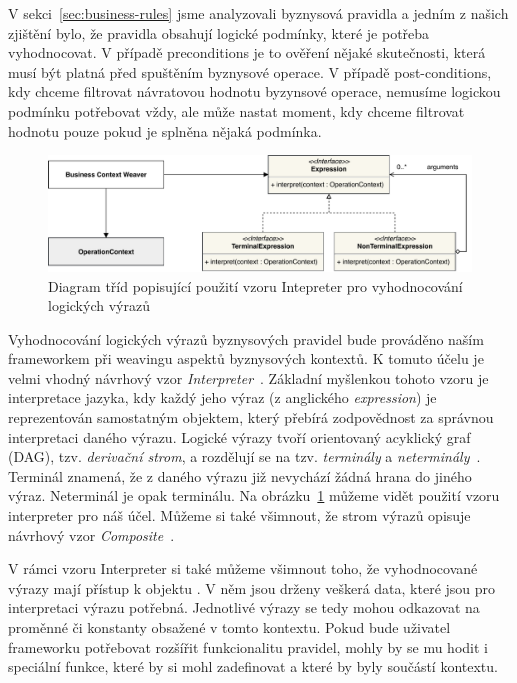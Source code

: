 V sekci~\ref{sec:business-rules} jsme analyzovali byznysová pravidla a jedním z
našich zjištění bylo, že pravidla obsahují logické podmínky, které je
potřeba vyhodnocovat. V případě preconditions je to ověření nějaké skutečnosti,
která musí být platná před spuštěním byznysové operace. V případě post-conditions,
kdy chceme filtrovat návratovou hodnotu byzynsové operace, nemusíme logickou podmínku
potřebovat vždy, ale může nastat moment, kdy chceme filtrovat hodnotu pouze pokud je
splněna nějaká podmínka.

\begin{figure}
    \centering
    \includegraphics[keepaspectratio=true, width=1\linewidth]{figures/expression.pdf}
    \caption{Diagram tříd popisující použití vzoru Intepreter pro vyhodnocování logických výrazů}
    \label{fig:expression}
\end{figure}

Vyhodnocování logických výrazů byznysových pravidel bude prováděno naším frameworkem
při weavingu aspektů byznysových kontextů. K tomuto účelu je velmi vhodný návrhový vzor
\textit{Interpreter}~\cite{fowler2002patterns}. Základní myšlenkou tohoto vzoru je
interpretace jazyka, kdy každý jeho výraz (z anglického \textit{expression}) je reprezentován
samostatným objektem, který přebírá zodpovědnost za správnou interpretaci daného výrazu.
Logické výrazy tvoří orientovaný acyklický graf (\gls{DAG}), tzv. \textit{derivační strom},
a rozdělují se na tzv. \textit{terminály} a \textit{neterminály}~\cite{melichar2003jazyky}. Terminál znamená,
že z daného výrazu již nevychází žádná hrana do jiného výraz. Neterminál je opak terminálu.
Na obrázku~\ref{fig:expression} můžeme vidět použití vzoru interpreter pro náš účel.
Můžeme si také všimnout, že strom výrazů opisuje návrhový vzor \textit{Composite}~\cite{fowler2002patterns}.

V rámci vzoru Interpreter si také můžeme všimnout toho, že vyhodnocované výrazy mají přístup
k objektu . V něm jsou drženy veškerá data, které jsou pro interpretaci
výrazu potřebná. Jednotlivé výrazy se tedy mohou odkazovat na proměnné či konstanty obsažené
v tomto kontextu. Pokud bude uživatel frameworku potřebovat rozšířit funkcionalitu pravidel,
mohly by se mu hodit i speciální funkce, které by si mohl zadefinovat a které by byly součástí
kontextu.


